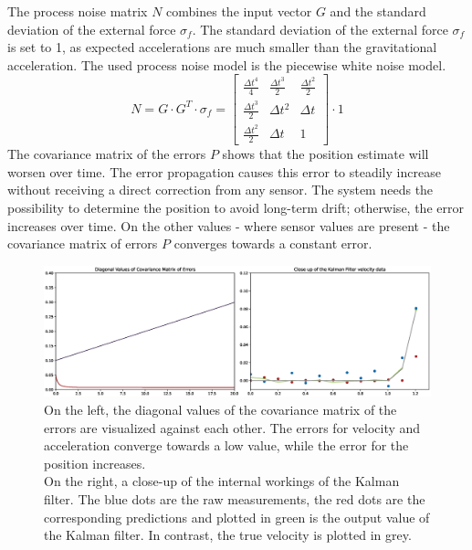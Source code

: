 The process noise matrix $N$ combines the input vector $G$ and the standard deviation of the external force $\sigma_{f}$. The standard deviation of the external force $\sigma_{f}$ is set to 1, as expected accelerations are much smaller than the gravitational acceleration. The used process noise model is the piecewise white noise model.
\begin{equation*}
    N = G\cdot G^{T}\cdot \sigma_{f} =
    \begin{bmatrix}
        \frac{\Delta t^{4}}{4} & \frac{\Delta t^{3}}{2} & \frac{\Delta t^{2}}{2} \\
        \frac{\Delta t^{3}}{2} & \Delta t^{2} & \Delta t \\
        \frac{\Delta t^{2}}{2} & \Delta t & 1
    \end{bmatrix}
    \cdot 1
\end{equation*}
The covariance matrix of the errors $P$ shows that the position estimate will worsen over time. The error propagation causes this error to steadily increase without receiving a direct correction from any sensor. The system needs the possibility to determine the position to avoid long-term drift; otherwise, the error increases over time. On the other values - where sensor values are present - the covariance matrix of errors $P$ converges towards a constant error.
\begin{figure}[H]
    \centering
    \includegraphics[width=1.0\textwidth]{images/Kalman_example_1d_error.eps}
    \caption{On the left, the diagonal values of the covariance matrix of the errors are visualized against each other. The errors for velocity and acceleration converge towards a low value, while the error for the position increases.\\
    On the right, a close-up of the internal workings of the Kalman filter. The blue dots are the raw measurements, the red dots are the corresponding predictions and plotted in green is the output value of the Kalman filter. In contrast, the true velocity is plotted in grey.}
    \label{im:KalmanError}
\end{figure}
